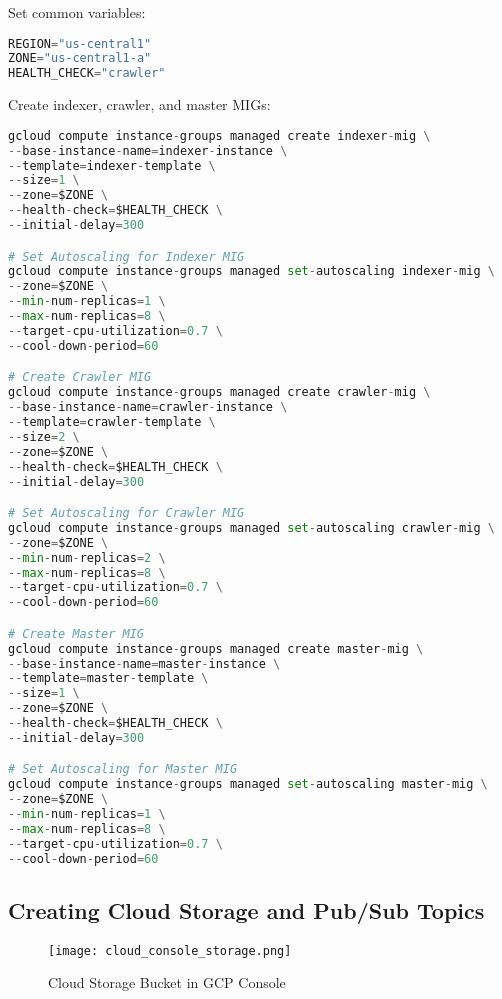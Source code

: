 \documentclass[12pt,a4paper]{report}
\begin{document}
Set common variables:
\begin{lstlisting}[language=Python]
REGION="us-central1"
ZONE="us-central1-a"
HEALTH_CHECK="crawler"    
\end{lstlisting}
Create indexer, crawler, and master MIGs:
\begin{lstlisting}[language=Python]
gcloud compute instance-groups managed create indexer-mig \
--base-instance-name=indexer-instance \
--template=indexer-template \
--size=1 \
--zone=$ZONE \
--health-check=$HEALTH_CHECK \
--initial-delay=300

# Set Autoscaling for Indexer MIG
gcloud compute instance-groups managed set-autoscaling indexer-mig \
--zone=$ZONE \
--min-num-replicas=1 \
--max-num-replicas=8 \
--target-cpu-utilization=0.7 \
--cool-down-period=60

# Create Crawler MIG
gcloud compute instance-groups managed create crawler-mig \
--base-instance-name=crawler-instance \
--template=crawler-template \
--size=2 \
--zone=$ZONE \
--health-check=$HEALTH_CHECK \
--initial-delay=300

# Set Autoscaling for Crawler MIG
gcloud compute instance-groups managed set-autoscaling crawler-mig \
--zone=$ZONE \
--min-num-replicas=2 \
--max-num-replicas=8 \
--target-cpu-utilization=0.7 \
--cool-down-period=60

# Create Master MIG
gcloud compute instance-groups managed create master-mig \
--base-instance-name=master-instance \
--template=master-template \
--size=1 \
--zone=$ZONE \
--health-check=$HEALTH_CHECK \
--initial-delay=300

# Set Autoscaling for Master MIG
gcloud compute instance-groups managed set-autoscaling master-mig \
--zone=$ZONE \
--min-num-replicas=1 \
--max-num-replicas=8 \
--target-cpu-utilization=0.7 \
--cool-down-period=60

\end{lstlisting}
\newpage
\subsection{Creating Cloud Storage and Pub/Sub Topics}
\begin{figure}[htb!]
    \centering
    \texttt{[image: cloud\_console\_storage.png]}
    \caption{Cloud Storage Bucket in GCP Console}
    \label{fig:storage-console}
\end{figure}
\end{document}
